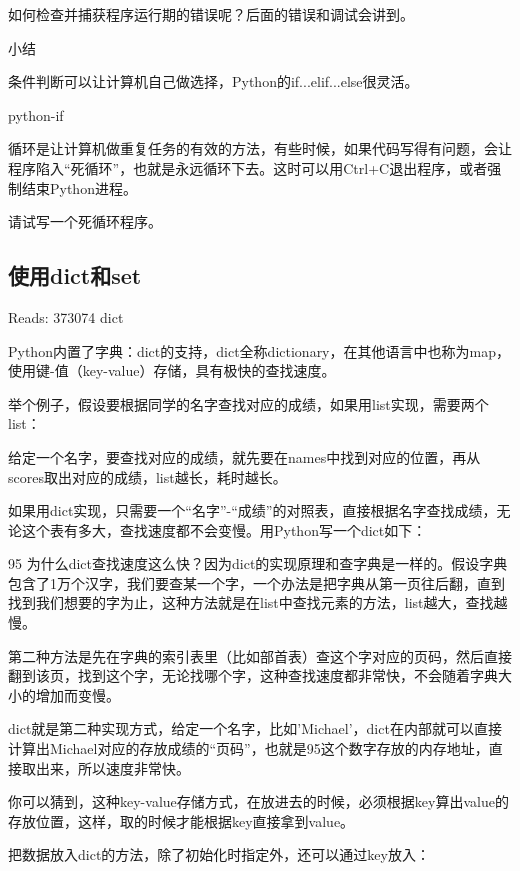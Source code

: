 \documentclass[10pt,a4paper]{ctexbook}
\begin{document}
如何检查并捕获程序运行期的错误呢？后面的错误和调试会讲到。

小结

条件判断可以让计算机自己做选择，Python的if...elif...else很灵活。

python-if

循环是让计算机做重复任务的有效的方法，有些时候，如果代码写得有问题，会让程序陷入“死循环”，也就是永远循环下去。这时可以用Ctrl+C退出程序，或者强制结束Python进程。


请试写一个死循环程序。






\subsection{使用dict和set}

Reads: 373074
dict

Python内置了字典：dict的支持，dict全称dictionary，在其他语言中也称为map，使用键-值（key-value）存储，具有极快的查找速度。

举个例子，假设要根据同学的名字查找对应的成绩，如果用list实现，需要两个list：

给定一个名字，要查找对应的成绩，就先要在names中找到对应的位置，再从scores取出对应的成绩，list越长，耗时越长。

如果用dict实现，只需要一个“名字”-“成绩”的对照表，直接根据名字查找成绩，无论这个表有多大，查找速度都不会变慢。用Python写一个dict如下：

95
为什么dict查找速度这么快？因为dict的实现原理和查字典是一样的。假设字典包含了1万个汉字，我们要查某一个字，一个办法是把字典从第一页往后翻，直到找到我们想要的字为止，这种方法就是在list中查找元素的方法，list越大，查找越慢。

第二种方法是先在字典的索引表里（比如部首表）查这个字对应的页码，然后直接翻到该页，找到这个字，无论找哪个字，这种查找速度都非常快，不会随着字典大小的增加而变慢。

dict就是第二种实现方式，给定一个名字，比如'Michael'，dict在内部就可以直接计算出Michael对应的存放成绩的“页码”，也就是95这个数字存放的内存地址，直接取出来，所以速度非常快。

你可以猜到，这种key-value存储方式，在放进去的时候，必须根据key算出value的存放位置，这样，取的时候才能根据key直接拿到value。

把数据放入dict的方法，除了初始化时指定外，还可以通过key放入：
\end{document}
